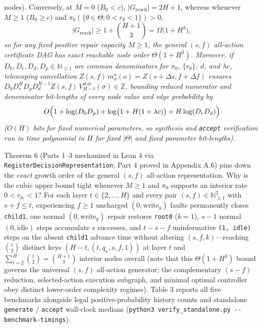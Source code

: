 \documentclass[11pt,a4paper]{article}
\begin{document}
\begin{enumerate}
{  nodes). Conversely, at \(M = 0\) (\(B_0 < c\)),
  \(|G_{\mathrm{reach}}| = 2H + 1\), whereas whenever \(M \ge 1\)
  (\(B_0 \ge c\)) and
  \(\pi_0(\{\theta \in \Theta : 0 < r_\theta < 1\}) > 0\),}
  \[|G_{\mathrm{reach}}| \ge 1 + \binom{H + 1}{3} = \Omega\bigl(1 + H^3\bigr),\]
  \emph{so for any fixed positive repair capacity \(M \ge 1\), the
  general \((s, f)\) all-action certificate DAG has exact reachable node
  order \(\Theta(1 + H^3)\). Moreover, if
  \(D_0, D_r, D_d, D_p \in \mathbb{N}_{\ge 1}\) are common denominators
  for \(\pi_0\), \(\{r_\theta\}\), \(d\), and \(\lambda c\), telescoping
  cancellation \(Z(s,f)\,m_\sigma^a(o) = Z(s + \Delta s, f + \Delta f)\)
  ensures
  \(D_0 D_r^H D_p D_d^{H-t} Z(s,f)\,V_{H-t}^{\mathrm{stat}}(\sigma) \in \mathbb{Z}\),
  bounding reduced numerator and denominator bit-lengths of every node
  value and edge probability by}
  \[O\Bigl(1 + \log(D_0 D_p) + \log\bigl(1 + H(1 + \lambda c)\bigr) + H\log(D_r D_d)\Bigr)\]
  \emph{(\(O(H)\) bits for fixed numerical parameters, so synthesis and
  \texttt{accept} verification run in time polynomial in \(H\) for fixed
  \(|\Theta|\) and fixed parameter bit-lengths).}
\end{enumerate}

Theorem 6 (Parts 1--3 mechanized in Lean 4 via
\texttt{RegisterDecisionRepresentation}; Part 4 proved in Appendix A.6)
pins down the \emph{exact} growth order of the general \((s,f)\)
all-action representation. Why is the cubic upper bound tight whenever
\(M \ge 1\) and \(\pi_0\) supports an interior rate
\(0 < r_{\theta_*} < 1\)? For each layer \(t \in \{2, \dots, H\}\) and
every pair \((s, f) \in \mathbb{N}_{\ge 1}^2\) with \(s + f \le t\),
experiencing \(f \ge 1\) uncharged \((0, \mathrm{write}_g)\) faults
permanently closes \texttt{child1}, one normal \((0, \mathrm{write}_g)\)
repair restores \texttt{root0} (\(k = 1\)), \(s - 1\) normal
\((0, \mathrm{idle})\) steps accumulate \(s\) successes, and
\(t - s - f\) uninformative \texttt{(1,\ idle)} steps on the absent
\texttt{child1} advance time without altering \((s, f, k)\)---reaching
\(\binom{t}{2}\) distinct keys \((H - t, (t, q_\star, s, f, 1))\) at
layer \(t\) and \(\sum_{t=2}^H \binom{t}{2} = \binom{H+1}{3}\) interior
nodes overall (note that this \(\Theta(1 + H^3)\) bound governs the
universal \((s,f)\) all-action generator; the complementary \((s - f)\)
reduction, selected-action execution subgraph, and minimal optimal
controller obey distinct lower-order complexity regimes). Table 3
reports all five benchmarks alongside legal positive-probability history
counts and standalone \texttt{generate} / \texttt{accept} wall-clock
medians
(\texttt{python3\ verify\_standalone.py\ -\/-benchmark-timings}).
\end{document}

